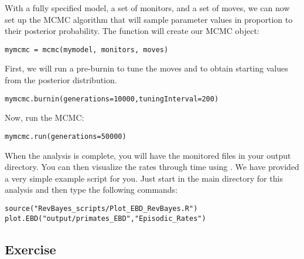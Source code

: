 With a fully specified model, a set of monitors, and a set of moves, we can now set up the MCMC algorithm that will sample parameter values in proportion to their posterior probability. The  function will create our MCMC object:
{\tt \begin{snugshade*}
\begin{lstlisting}
mymcmc = mcmc(mymodel, monitors, moves)
\end{lstlisting}
\end{snugshade*}}

First, we will run a pre-burnin to tune the moves and to obtain starting values from the posterior distribution.
{\tt \begin{snugshade*}
\begin{lstlisting}
mymcmc.burnin(generations=10000,tuningInterval=200)
\end{lstlisting}
\end{snugshade*}}


Now, run the MCMC:
{\tt \begin{snugshade*}
\begin{lstlisting}
mymcmc.run(generations=50000)
\end{lstlisting}
\end{snugshade*}}

When the analysis is complete, you will have the monitored files in your output directory.
You can then visualize the rates through time using \R.
We have provided a very simple example script for you.
Just start \R in the main directory for this analysis and then type the following commands:
{\tt \begin{snugshade*}
\begin{lstlisting}
source("RevBayes_scripts/Plot_EBD_RevBayes.R")
plot.EBD("output/primates_EBD","Episodic_Rates")
\end{lstlisting}
\end{snugshade*}}



\subsection{Exercise}

